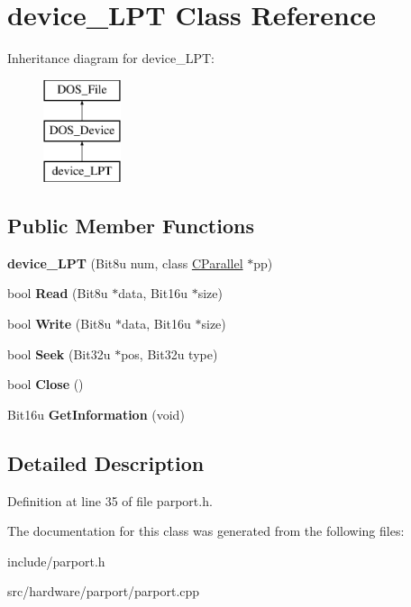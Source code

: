 \hypertarget{classdevice__LPT}{\section{device\-\_\-\-L\-P\-T Class Reference}
\label{classdevice__LPT}
}
Inheritance diagram for device\-\_\-\-L\-P\-T\-:\begin{figure}[H]
\begin{center}
\leavevmode
\includegraphics[height=3.000000cm]{classdevice__LPT}
\end{center}
\end{figure}
\subsection*{Public Member Functions}
\begin{DoxyCompactItemize}
\item 
\hypertarget{classdevice__LPT_a0fe0f1dcd98ebcc2d1338989f6cd8ce2}{{\bfseries device\-\_\-\-L\-P\-T} (Bit8u num, class \hyperlink{classCParallel}{C\-Parallel} $\ast$pp)}\label{classdevice__LPT_a0fe0f1dcd98ebcc2d1338989f6cd8ce2}

\item 
\hypertarget{classdevice__LPT_accdd4209aa20091bac0e7421b8bede4a}{bool {\bfseries Read} (Bit8u $\ast$data, Bit16u $\ast$size)}\label{classdevice__LPT_accdd4209aa20091bac0e7421b8bede4a}

\item 
\hypertarget{classdevice__LPT_a71e6f560b6d2b9569a204adedf342bda}{bool {\bfseries Write} (Bit8u $\ast$data, Bit16u $\ast$size)}\label{classdevice__LPT_a71e6f560b6d2b9569a204adedf342bda}

\item 
\hypertarget{classdevice__LPT_abe09b700e40219a83df6970a4736646c}{bool {\bfseries Seek} (Bit32u $\ast$pos, Bit32u type)}\label{classdevice__LPT_abe09b700e40219a83df6970a4736646c}

\item 
\hypertarget{classdevice__LPT_a4b2fcab25e3e3b0a40e5ad7b4285147e}{bool {\bfseries Close} ()}\label{classdevice__LPT_a4b2fcab25e3e3b0a40e5ad7b4285147e}

\item 
\hypertarget{classdevice__LPT_a6ff3740aaab3006b025cc06bef4163fe}{Bit16u {\bfseries Get\-Information} (void)}\label{classdevice__LPT_a6ff3740aaab3006b025cc06bef4163fe}

\end{DoxyCompactItemize}


\subsection{Detailed Description}


Definition at line 35 of file parport.\-h.



The documentation for this class was generated from the following files\-:\begin{DoxyCompactItemize}
\item 
include/parport.\-h\item 
src/hardware/parport/parport.\-cpp\end{DoxyCompactItemize}
